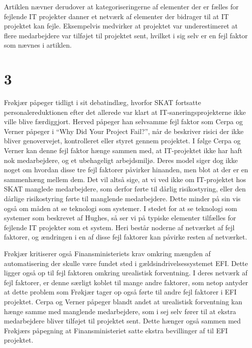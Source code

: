 \documentclass[11pt]{article}
\begin{document}
Artiklen nævner derudover at kategoriseringerne af elementer der er fælles for
fejlende IT projekter danner et netværk af elementer der bidrager til at IT
projektet kan fejle. Eksempelvis medvirker at projektet var underestimeret at
flere medarbejdere var tilføjet til projektet sent, hvilket i sig selv er en
fejl faktor som nævnes i artiklen.


\section{3}
\label{sec:orgb4e622a}

Frøkjær påpeger tidligt i sit debatindlæg, hvorfor SKAT fortsatte
personalereduktionen efter det allerede var klart at IT-saneringsprojekterne ikke
ville blive færdiggjort. Herved påpeger han selvsamme fejl faktor som Cerpa og
Verner påpeger i ``Why Did Your Project Fail?''\cite{cerpaverner}, når de
beskriver risici der ikke bliver genovervejet, kontrolleret eller styret gennem
projektet. I følge Cerpa og Verner kan denne fejl faktor hænge sammen med,
at IT-projektet ikke har haft nok medarbejdere, og et ubehageligt arbejdsmiljø. Deres
model siger dog ikke noget om hvordan disse tre fejl faktorer påvirker hinanden,
men blot at der er en sammenhæng mellem dem. Det vil altså sige, at vi ved ikke
om IT-projektet hos SKAT manglede medarbejdere, som derfor førte til dårlig risikostyring, eller
den dårlige risikostyring førte til manglende medarbejdere. Dette minder på sin
vis også om måden at se teknologi som systemer. I stedet for at se teknologi som
systemer som beskrevet af Hughes\cite{hughes}, så ser vi på typiske elementer tilfælles for fejlende IT projekter som
et system. Heri består noderne af netværket af fejl faktorer, og ændringen i en
af disse fejl faktorer kan påvirke resten af netværket.

Frøkjær kritiserer også Finansministeriets krav omkring mængden af automatisering
der skulle være fundet sted i gældsindrivelsessystemet EFI. Dette ligger også op
til fejl faktoren omkring urealistisk forventning\cite{cerpaverner}. I deres
netværk af fejl faktorer, er denne særligt koblet til mange andre faktorer, som netop
antyder at dette problem som Frøkjær tager op også førte til andre fejl faktorer
i EFI projektet. Cerpa og Verner påpeger blandt andet at urealistisk forventning
kan hænge samme med manglende medarbejdere, som i sej selv fører til at ekstra
medarbejdere bliver tilføjet til projektet sent. Dette hænger også sammen med
Frøkjærs påpegning at  Finansministeriet satte ekstra
bevillinger af til EFI projektet.
\end{document}
